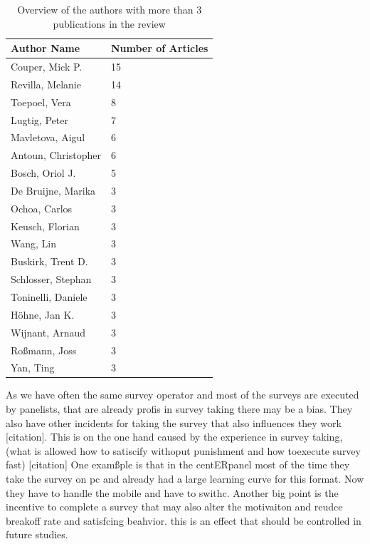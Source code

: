 \begin{table}
	\centering
	\begin{tabular}{ll}
		\toprule
		Author Name & Number of Articles \\
		\midrule
		Couper, Mick P. &        15 \\
        Revilla, Melanie &      14\\
        Toepoel, Vera  &         8\\
        Lugtig, Peter   &        7\\
        Mavletova, Aigul    &    6\\
        Antoun, Christopher  &   6\\
        Bosch, Oriol J.   &      5\\
        De Bruijne, Marika  &    3\\
        Ochoa, Carlos      &     3\\
        Keusch, Florian     &    3\\
        Wang, Lin           &    3\\
        Buskirk, Trent D.     &  3\\
        Schlosser, Stephan  &   3\\
        Toninelli, Daniele   &   3\\
        Höhne, Jan K.        &   3\\
        Wijnant, Arnaud      &   3\\
        Roßmann, Joss       &    3\\
        Yan, Ting            &   3\\
		\bottomrule 
	\end{tabular}
	\caption{Overview of the authors with more than 3 publications in the review}
	\label{tab: authors}
\end{table}

As we have often the same survey operator and most of the surveys are executed by panelists, that are already profis in survey taking there may be a bias. They also have other incidents for taking the survey that also influences they work [citation]. This is on the one hand caused by the experience in survey taking, (what is allowed how to satiscify withoput punishment and how toexecute survey fast) [citation] One examßple is that in the centERpanel most of the time they take the survey on pc and already had a large learning curve for this format. Now they have to handle the mobile and have to swithc. Another big point is the incentive to complete a survey that may also alter the motivaiton and reudce breakoff rate and satisfcing beahvior. this is an effect that should be controlled in future studies. 

